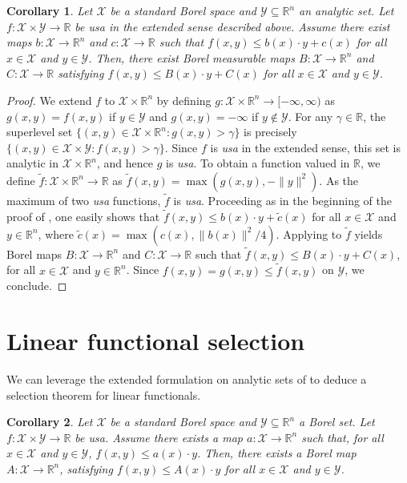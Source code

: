 \documentclass[10pt, a4paper]{article}
\newcommand{\R}{\mathbb R}
\newcommand{\usa}{\emph{usa}\xspace}
\newcommand{\X}{\mathcal X}
\newcommand{\Y}{\mathcal Y}
\newtheorem{corollary}{Corollary}
\begin{document}
\begin{corollary}\label{cor:analytic}
Let $\X$ be a standard Borel space and $\Y\subseteq\R^n$ an analytic set. Let $f:\X\times \Y\to\R$ be \usa in the extended sense described above. Assume there exist maps $b:\X\to\R^n$ and $c:\X\to\R$ such that $f(x,y)\leq b(x)\cdot y + c(x)$ for all $x\in\X$ and $y\in\Y$. Then, there exist Borel measurable maps $B:\X\to\R^n$ and $C:\X\to\R$ satisfying $f(x,y)\leq B(x)\cdot y + C(x)$ for all $x\in\X$ and $y\in\Y$.
\end{corollary}
\begin{proof}We extend $f$ to $\X \times \R^n$ by defining $g: \X \times \R^n \to [-\infty, \infty)$ as $g(x,y) = f(x,y)$ if $y\in\Y$ and $g(x,y)=-\infty$ if $y\notin\Y$. For any $\gamma \in \R$, the superlevel set $\{(x,y) \in \X \times \R^n : g(x,y) > \gamma\}$ is precisely $\{(x,y) \in \X \times \Y : f(x,y) > \gamma\}$. Since $f$ is \usa in the extended sense, this set is analytic in $\X \times \R^n$, and hence $g$ is \usa. To obtain a function valued in $\R$, we define $\tilde{f}: \X \times \R^n \to \R$ as $\tilde{f}(x,y) = \max(g(x,y), -\|y\|^2)$. As the maximum of two \usa functions, $\tilde{f}$ is \usa. Proceeding as in the beginning of the proof of , one easily shows that $\tilde{f}(x,y) \le b(x)\cdot y + \tilde{c}(x)$ for all $x \in \X$ and $y \in \R^n$, where $\tilde{c}(x) = \max(c(x), \|b(x)\|^2/4)$. Applying  to $\tilde{f}$ yields Borel  maps $B: \X \to \R^n$ and $C: \X \to \R$ such that $\tilde{f}(x,y) \leq B(x)\cdot y + C(x)$, for all $x \in \X$ and $y \in \R^n$. Since $f(x,y) = g(x,y) \leq \tilde{f}(x,y)$ on $\Y$, we conclude.\end{proof}

\section{Linear functional selection}
We can leverage the extended formulation on analytic sets of  to deduce a selection theorem for  linear functionals.

\begin{corollary}\label{cor:linfunc}
Let $\X$ be a standard Borel space and $\Y\subseteq \mathbb R^n$ a Borel set. Let $f:\X\times \Y\to\R$ be \usa. Assume there exists a map $a:\X\to\R^n$ such that, for all $x\in\X$ and $y\in\Y$, $f(x,y)\le a(x)\cdot y$. Then, there exists a Borel  map $A:\X\to\mathbb R^n$, satisfying $f(x,y)\leq A(x)\cdot y$ for all $x\in\X$ and $y\in\Y$.
\end{corollary}
\end{document}
